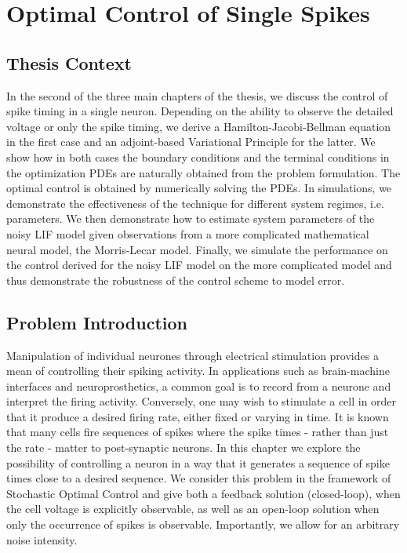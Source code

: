 \chapter{Optimal Control of Single Spikes}
\label{ch:spike_control}
\graphicspath{{../OptSpike/}}


\section{Thesis Context}
In the second of the three main chapters of the thesis, we discuss the control
of spike timing in a single neuron. Depending on the ability to observe the
detailed voltage or only the spike timing, we derive a Hamilton-Jacobi-Bellman
equation in the first case and an adjoint-based Variational Principle for the
latter. We show how in both cases the boundary conditions and the terminal
conditions in the optimization PDEs are naturally obtained from the problem
formulation. The optimal control is obtained by numerically solving the PDEs.
In simulations, we demonstrate the effectiveness of the technique for
different system regimes, i.e. parameters. We then
demonstrate how to estimate system parameters of the noisy LIF model given
observations from a more complicated mathematical neural model, the Morris-Lecar
model. Finally, we simulate the performance on the control derived for the
noisy LIF model on the more complicated model and thus demonstrate the
robustness of the control scheme to model error. 


\section{Problem Introduction} 
Manipulation of individual neurones through electrical stimulation provides a
mean of controlling their spiking activity. In applications such as
brain-machine interfaces and neuroprosthetics, a common goal is to record from a
neurone and interpret the firing activity. Conversely, one may wish to stimulate
a cell in order that it produce a desired firing rate, either fixed or varying
in time. It is known that many cells fire sequences of spikes where the spike
times - rather than just the rate - matter to post-synaptic neurons. In this
chapter we explore the possibility of controlling a neuron in a way that it
generates a sequence of spike times close to a desired sequence. 
We consider this problem in the framework of Stochastic Optimal Control and
give both a feedback solution (closed-loop), when the cell voltage is
explicitly observable, as well as an open-loop solution when only the
occurrence of spikes is observable. Importantly, we allow for an
arbitrary noise intensity.


